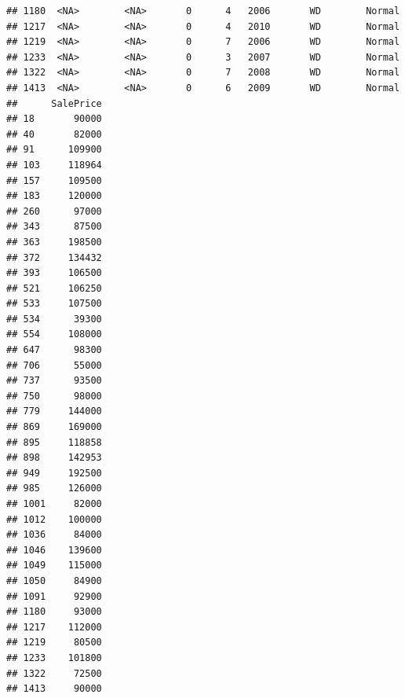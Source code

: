 \documentclass[]{article}
\newenvironment{Shaded}{\begin{snugshade}}{\end{snugshade}}
\newcommand{\KeywordTok}[1]{\textcolor[rgb]{0.13,0.29,0.53}{\textbf{#1}}}
\newcommand{\StringTok}[1]{\textcolor[rgb]{0.31,0.60,0.02}{#1}}
\newcommand{\OperatorTok}[1]{\textcolor[rgb]{0.81,0.36,0.00}{\textbf{#1}}}
\newcommand{\NormalTok}[1]{#1}
\begin{document}
\begin{verbatim}
## 1180  <NA>        <NA>       0      4   2006       WD        Normal
## 1217  <NA>        <NA>       0      4   2010       WD        Normal
## 1219  <NA>        <NA>       0      7   2006       WD        Normal
## 1233  <NA>        <NA>       0      3   2007       WD        Normal
## 1322  <NA>        <NA>       0      7   2008       WD        Normal
## 1413  <NA>        <NA>       0      6   2009       WD        Normal
##      SalePrice
## 18       90000
## 40       82000
## 91      109900
## 103     118964
## 157     109500
## 183     120000
## 260      97000
## 343      87500
## 363     198500
## 372     134432
## 393     106500
## 521     106250
## 533     107500
## 534      39300
## 554     108000
## 647      98300
## 706      55000
## 737      93500
## 750      98000
## 779     144000
## 869     169000
## 895     118858
## 898     142953
## 949     192500
## 985     126000
## 1001     82000
## 1012    100000
## 1036     84000
## 1046    139600
## 1049    115000
## 1050     84900
## 1091     92900
## 1180     93000
## 1217    112000
## 1219     80500
## 1233    101800
## 1322     72500
## 1413     90000
\end{verbatim}

\begin{Shaded}
\end{Shaded}
\end{document}
